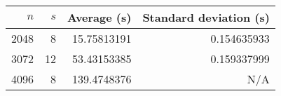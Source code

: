 \begin{tabular}{rrrr}
$n$ & $s$ & Average (s) & Standard deviation (s)\\\hline
2048 & 8 & 15.75813191 & 0.154635933\\
3072 & 12 & 53.43153385 & 0.159337999\\
4096 & 8 & 139.4748376 & N/A\\
\end{tabular}
